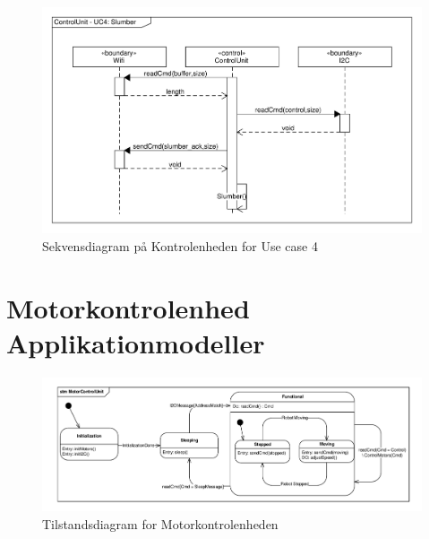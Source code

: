 \begin{figure} [H]
	\centering
	\includegraphics[clip, trim = 0cm 0cm 0cm 0.5cm ,width = \textwidth]{Figur/seq_Robot_UC4.pdf}
	\caption{Sekvensdiagram på Kontrolenheden for Use case 4}
	\label{fig:seq_Robot_UC4}
\end{figure}
\newpage
\section{Motorkontrolenhed Applikationmodeller}
\begin{figure} [H]
	\centering
	\includegraphics[width = \textwidth]{Figur/STM_MotorControlUnit.pdf}
	\caption{Tilstandsdiagram for Motorkontrolenheden}
	\label{fig:STM_MotorControlUnit}
\end{figure}